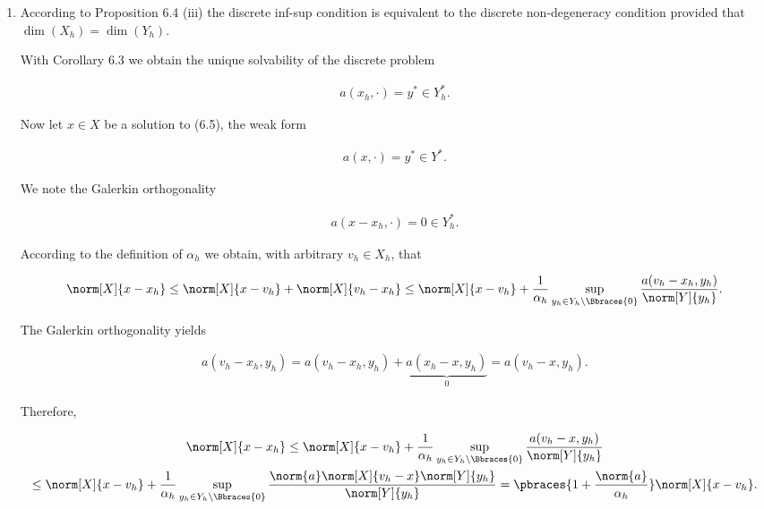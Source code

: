 \begin{solution}

\phantom{}

\begin{enumerate}[label = \textbf{\alph*)}]

  \item According to Proposition 6.4 (iii) the discrete inf-sup condition is equivalent to the discrete non-degeneracy condition provided that $\dim(X_h) = \dim(Y_h)$.
  
  
  With Corollary 6.3 we obtain the unique solvability of the discrete problem

  \begin{align*}
    a(x_h, \cdot) = y^\ast \in Y_h^\ast.
  \end{align*}


  Now let $x \in X$ be a solution to (6.5), the weak form

  \begin{align*}
    a(x, \cdot) = y^\ast \in Y^\ast.
  \end{align*}

  We note the Galerkin orthogonality

  \begin{align*}
    a(x - x_h, \cdot) = 0 \in Y_h^\ast.
  \end{align*}

  According to the definition of $\alpha_h$ we obtain, with arbitrary $v_h \in X_h$, that

  \begin{align*}
    \norm[X]{x - x_h} \leq \norm[X]{x- v_h} + \norm[X]{v_h - x_h}
    \leq
    \norm[X]{x - v_h} + \frac{1}{\alpha_h} \sup_{y_h \in Y_h \setminus \Bbraces{0}} \frac{a(v_h - x_h, y_h)}{\norm[Y]{y_h}}.
  \end{align*}

  The Galerkin orthogonality yields

  \begin{align*}
    a(v_h - x_h, y_h) = a(v_h - x_h, y_h) + \underbrace{a(x_h - x, y_h)}_0 = a(v_h - x, y_h).
  \end{align*}

  Therefore,

  \begin{multline*}
    \norm[X]{x - x_h} \leq \norm[X]{x - v_h} + \frac{1}{\alpha_h} \sup_{y_h \in Y_h\setminus \Bbraces{0}} \frac{a(v_h-x, y_h)}{\norm[Y]{y_h}} \\
    \leq
    \norm[X]{x- v_h} + \frac{1}{\alpha_h} \sup_{y_h \in Y_h\setminus \Bbraces{0}} \frac{\norm{a}
    \norm[X]{v_h - x} \norm[Y]{y_h}}{\norm[Y]{y_h}}
    =
    \pbraces{1 + \frac{\norm{a}}{\alpha_h}} \norm[X]{x- v_h}.
  \end{multline*}


\end{enumerate}
\end{solution}
